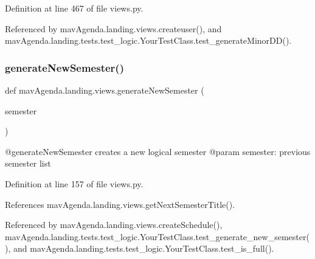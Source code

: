 Definition at line 467 of file views.\+py.



Referenced by mav\+Agenda.\+landing.\+views.\+createuser(), and mav\+Agenda.\+landing.\+tests.\+test\+\_\+logic.\+Your\+Test\+Class.\+test\+\_\+generate\+Minor\+D\+D().

\mbox{\label{namespacemavAgenda_1_1landing_1_1views_a3ce0d3f74eb2fd5b10052c2c019478a1}} 
\subsubsection{\texorpdfstring{generate\+New\+Semester()}{generateNewSemester()}}
{\footnotesize\ttfamily def mav\+Agenda.\+landing.\+views.\+generate\+New\+Semester (\begin{DoxyParamCaption}\item[{}]{semester }\end{DoxyParamCaption})}

\begin{DoxyVerb}@generateNewSemester creates a new logical semester
@param semester: previous semester list
\end{DoxyVerb}
 

Definition at line 157 of file views.\+py.



References mav\+Agenda.\+landing.\+views.\+get\+Next\+Semester\+Title().



Referenced by mav\+Agenda.\+landing.\+views.\+create\+Schedule(), mav\+Agenda.\+landing.\+tests.\+test\+\_\+logic.\+Your\+Test\+Class.\+test\+\_\+generate\+\_\+new\+\_\+semester(), and mav\+Agenda.\+landing.\+tests.\+test\+\_\+logic.\+Your\+Test\+Class.\+test\+\_\+is\+\_\+full().

\mbox{\label{namespacemavAgenda_1_1landing_1_1views_a49e86f3d201ca31fde603a8555dac464}} 
